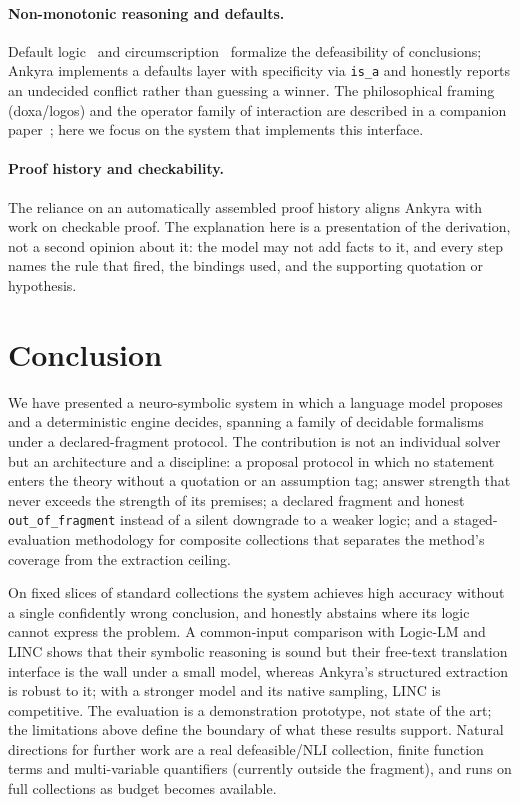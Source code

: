 \documentclass[11pt,a4paper]{article}
\begin{document}
\paragraph{Non-monotonic reasoning and defaults.} Default logic~\cite{reiter} and
circumscription~\cite{mccarthy} formalize the defeasibility of conclusions; Ankyra
implements a defaults layer with specificity via \texttt{is\_a} and honestly reports an
undecided conflict rather than guessing a winner. The philosophical framing (doxa/logos) and
the operator family of interaction are described in a companion paper~\cite{doxa}; here we
focus on the system that implements this interface.

\paragraph{Proof history and checkability.} The reliance on an automatically assembled proof
history aligns Ankyra with work on checkable proof. The explanation here is a presentation
of the derivation, not a second opinion about it: the model may not add facts to it, and
every step names the rule that fired, the bindings used, and the supporting quotation or
hypothesis.

\section{Conclusion}

We have presented a neuro-symbolic system in which a language model proposes and a
deterministic engine decides, spanning a family of decidable formalisms under a
declared-fragment protocol. The contribution is not an individual solver but an architecture
and a discipline: a proposal protocol in which no statement enters the theory without a
quotation or an assumption tag; answer strength that never exceeds the strength of its
premises; a declared fragment and honest \texttt{out\_of\_fragment} instead of a silent
downgrade to a weaker logic; and a staged-evaluation methodology for composite collections
that separates the method's coverage from the extraction ceiling.

On fixed slices of standard collections the system achieves high accuracy without a single
confidently wrong conclusion, and honestly abstains where its logic cannot express the
problem. A common-input comparison with Logic-LM and LINC shows that their symbolic reasoning
is sound but their free-text translation interface is the wall under a small model, whereas
Ankyra's structured extraction is robust to it; with a stronger model and its native
sampling, LINC is competitive. The evaluation is a demonstration prototype, not state of the
art; the limitations above define the boundary of what these results support. Natural
directions for further work are a real defeasible/NLI collection, finite function terms and
multi-variable quantifiers (currently outside the fragment), and runs on full collections as
budget becomes available.
\end{document}

